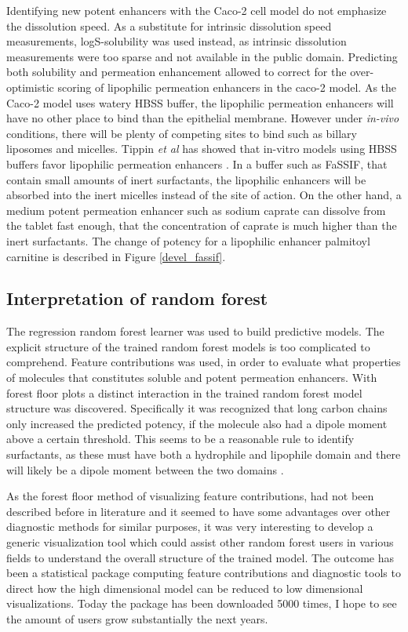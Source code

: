 Identifying new potent enhancers with the Caco-2 cell model do not emphasize the dissolution speed. As a substitute for intrinsic dissolution speed measurements, logS-solubility was used instead, as intrinsic dissolution measurements were too sparse and not available in the public domain. Predicting both solubility and permeation enhancement allowed to correct for the over-optimistic scoring of lipophilic permeation enhancers in the caco-2 model. As the Caco-2 model uses watery HBSS buffer, the lipophilic permeation enhancers will have no other place to bind than the epithelial membrane. However under \textit{in-vivo} conditions, there will be plenty of competing sites to bind such as billary liposomes and micelles. Tippin \textit{et al} has showed that in-vitro models using HBSS buffers favor lipophilic permeation enhancers \cite{tippin2008biorelevant}. In a buffer such as FaSSIF, that contain small amounts of inert surfactants, the lipophilic enhancers will be absorbed into the inert micelles instead of the site of action. On the other hand, a medium potent permeation enhancer such as sodium caprate can dissolve from the tablet fast enough, that the concentration of caprate is much higher than the inert surfactants. The change of potency for a lipophilic enhancer palmitoyl carnitine is described in Figure \ref{devel_fassif}.


\subsection{Interpretation of random forest}
The regression random forest learner was used to build predictive models. The explicit structure of the trained random forest models is too complicated to comprehend. Feature contributions was used, in order to evaluate what properties of molecules that constitutes soluble and potent permeation enhancers. With forest floor plots a distinct interaction in the trained random forest model structure was discovered. Specifically it was recognized that long carbon chains only increased the predicted potency, if the molecule also had a dipole moment above a certain threshold. This seems to be a reasonable rule to identify surfactants, as these must have both a hydrophile and lipophile domain and there will likely be a dipole moment between the two domains \cite{rosen2012surfactants}.

As the forest floor method of visualizing feature contributions, had not been described before in literature and it seemed to have some advantages over other diagnostic methods for similar purposes, it was very interesting to develop a generic visualization tool which could assist other random forest users in various fields to understand the overall structure of the trained model. The outcome has been a statistical package computing feature contributions and diagnostic tools to direct how the high dimensional model can be reduced to low dimensional visualizations. Today the package has been downloaded 5000 times, I hope to see the amount of users grow substantially the next years.